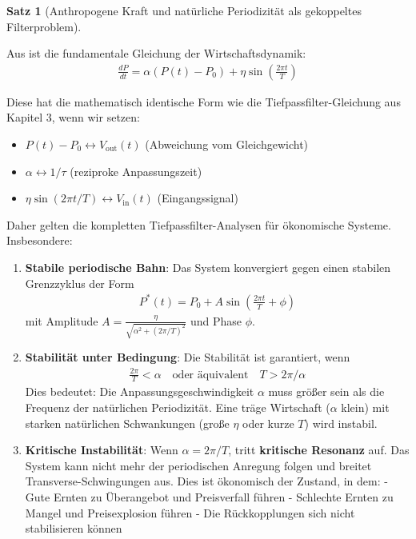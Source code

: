 \documentclass[a4paper,12pt,twoside]{report}
\theoremstyle{definition}
\newtheorem{satz}{Satz}
\begin{document}
\begin{satz}[Anthropogene Kraft und natürliche Periodizität als gekoppeltes Filterproblem]
\label{satz:zwei_kraefte_resonanz}

Aus \cite{epp_signal} ist die fundamentale Gleichung der Wirtschaftsdynamik:
\begin{align}
\frac{dP}{dt} = \alpha(P(t) - P_0) + \eta \sin\left(\frac{2\pi t}{T}\right)
\end{align}

Diese hat die mathematisch identische Form wie die Tiefpassfilter-Gleichung aus Kapitel 3, wenn wir setzen:
\begin{itemize}
\item $P(t) - P_0 \leftrightarrow V_{\text{out}}(t)$  (Abweichung vom Gleichgewicht)
\item $\alpha \leftrightarrow 1/\tau$ (reziproke Anpassungszeit)
\item $\eta \sin(2\pi t/T) \leftrightarrow V_{\text{in}}(t)$ (Eingangssignal)
\end{itemize}

Daher gelten die kompletten Tiefpassfilter-Analysen für ökonomische Systeme. Insbesondere:

\begin{enumerate}

\item \textbf{Stabile periodische Bahn}: Das System konvergiert gegen einen stabilen Grenzzyklus der Form
\begin{align}
P^*(t) = P_0 + A \sin\left(\frac{2\pi t}{T} + \phi\right)
\end{align}
mit Amplitude $A = \frac{\eta}{\sqrt{\alpha^2 + (2\pi/T)^2}}$ und Phase $\phi$.

\item \textbf{Stabilität unter Bedingung}: Die Stabilität ist garantiert, wenn
\begin{align}
\frac{2\pi}{T} < \alpha \quad \text{oder äquivalent} \quad T > 2\pi / \alpha
\end{align}
Dies bedeutet: Die Anpassungsgeschwindigkeit $\alpha$ muss größer sein als die Frequenz der natürlichen Periodizität. Eine träge Wirtschaft ($\alpha$ klein) mit starken natürlichen Schwankungen (große $\eta$ oder kurze $T$) wird instabil.

\item \textbf{Kritische Instabilität}: Wenn $\alpha = 2\pi/T$, tritt \textbf{kritische Resonanz} auf. Das System kann nicht mehr der periodischen Anregung folgen und breitet Transverse-Schwingungen aus. Dies ist ökonomisch der Zustand, in dem:\newline
- Gute Ernten zu Überangebot und Preisverfall führen
- Schlechte Ernten zu Mangel und Preisexplosion führen
- Die Rückkopplungen sich nicht stabilisieren können


\end{enumerate}
\end{satz}
\end{document}
